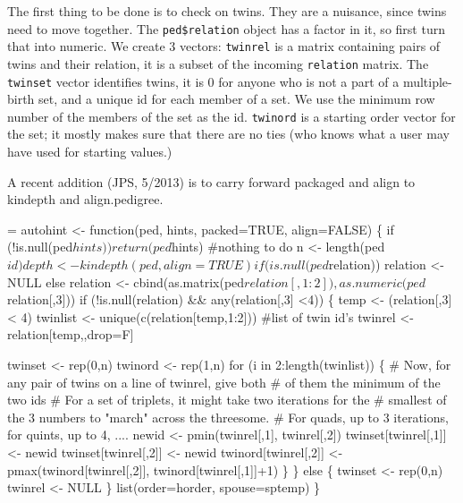 \documentclass{article}
\begin{document}
The first thing to be done is to check on twins.  They are a nuisance, since
twins need to move together.  The \Verb!ped$relation! object has a factor in it, 
so first turn that into numeric.
We create 3 vectors: \Verb!twinrel! is a matrix containing pairs of twins and
their relation, it is a subset of the incoming \Verb!relation! matrix.
The \Verb!twinset! vector identifies twins, it is 0 for anyone who is not a 
part of a multiple-birth set, and a unique id for each member of a set.  
We use the minimum row number of the members of the set as the id.
\Verb!twinord! is a starting order vector for the set; it mostly makes sure
that there are no ties (who knows what a user may have used for starting 
values.)  

A recent addition (JPS, 5/2013) is to carry forward packaged and align to 
kindepth and align.pedigree.

\begin{nwchunk}
=
 autohint <- function(ped, hints, packed=TRUE, align=FALSE) \{
     if (!is.null(ped$hints)) return(ped$hints)  #nothing to do
     n <- length(ped$id)
     depth <- kindepth(ped, align=TRUE)
 
     if (is.null(ped$relation)) relation <- NULL
     else  relation <- cbind(as.matrix(ped$relation[,1:2]), 
                             as.numeric(ped$relation[,3]))
     if (!is.null(relation) && any(relation[,3] <4)) \{
         temp <- (relation[,3] < 4)
         twinlist <- unique(c(relation[temp,1:2]))  #list of twin id's 
         twinrel  <- relation[temp,,drop=F]
         
         twinset <- rep(0,n)
         twinord <- rep(1,n)
         for (i in 2:length(twinlist)) \{
             # Now, for any pair of twins on a line of twinrel, give both
             #  of them the minimum of the two ids
             # For a set of triplets, it might take two iterations for the
             #  smallest of the 3 numbers to "march" across the threesome.
             #  For quads, up to 3 iterations, for quints, up to 4, ....
             newid <- pmin(twinrel[,1], twinrel[,2])
             twinset[twinrel[,1]] <- newid
             twinset[twinrel[,2]] <- newid
             twinord[twinrel[,2]] <- pmax(twinord[twinrel[,2]], 
                                          twinord[twinrel[,1]]+1)
             \}        
         \}
     else \{
         twinset <- rep(0,n)
         twinrel <- NULL
         \}
     list(order=horder, spouse=sptemp)    
     \}
\end{nwchunk}
\end{document}
